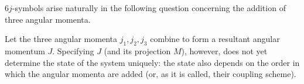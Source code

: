 $6j$-symbols arise naturally in the following question concerning the addition of three angular momenta.

Let the three angular momenta $j_1,j_2,j_3$ combine to form a resultant angular momentum $J$. Specifying $J$ (and its projection $M$), however, does not yet determine the state of the system uniquely: the state also depends on the order in which the angular momenta are added (or, as it is called, their coupling scheme).
